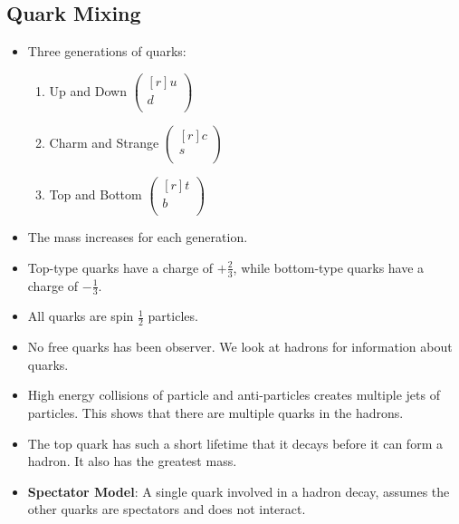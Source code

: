 \subsection{Quark Mixing}
\begin{itemize}
    \item Three generations of quarks: 
    \begin{enumerate}
        \item Up and Down $\displaystyle \begin{pmatrix*}[r]
         u \\
         d \\
        \end{pmatrix*}$
        \item Charm and Strange $\displaystyle \begin{pmatrix*}[r]
         c \\
         s \\
        \end{pmatrix*}$
        \item Top and Bottom $\displaystyle \begin{pmatrix*}[r]
         t \\
         b \\
        \end{pmatrix*}$
    \end{enumerate}
    \item The mass increases for each generation.
    \item Top-type quarks have a charge of $+\frac{2}{3}$, while bottom-type quarks have a charge of $-\frac{1}{3}$.
    \item All quarks are spin $\frac{1}{2}$ particles.
    \item No free quarks has been observer. We look at hadrons for information about quarks.
    \item High energy collisions of particle and anti-particles creates multiple jets of particles. This shows that there are multiple quarks in the hadrons.
    \item The top quark has such a short lifetime that it decays before it can form a hadron. It also has the greatest mass. 
    \item \textbf{Spectator Model}: A single quark involved in a hadron decay, assumes the other quarks are spectators and does not interact. 
    
    
\end{itemize}
